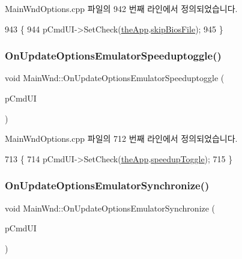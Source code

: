Main\+Wnd\+Options.\+cpp 파일의 942 번째 라인에서 정의되었습니다.


\begin{DoxyCode}
943 \{
944   pCmdUI->SetCheck(\mbox{\hyperlink{_v_b_a_8cpp_a8095a9d06b37a7efe3723f3218ad8fb3}{theApp}}.\mbox{\hyperlink{class_v_b_a_a5cb340a521f9f53bf082a63b26fbda25}{skipBiosFile}});
945 \}
\end{DoxyCode}
\mbox{\label{class_main_wnd_af19332119096c90e31ee0c2f49ec8359}} 
\subsubsection{\texorpdfstring{On\+Update\+Options\+Emulator\+Speeduptoggle()}{OnUpdateOptionsEmulatorSpeeduptoggle()}}
{\footnotesize\ttfamily void Main\+Wnd\+::\+On\+Update\+Options\+Emulator\+Speeduptoggle (\begin{DoxyParamCaption}\item[{C\+Cmd\+UI $\ast$}]{p\+Cmd\+UI }\end{DoxyParamCaption})\hspace{0.3cm}{\ttfamily [protected]}}



Main\+Wnd\+Options.\+cpp 파일의 712 번째 라인에서 정의되었습니다.


\begin{DoxyCode}
713 \{
714   pCmdUI->SetCheck(\mbox{\hyperlink{_v_b_a_8cpp_a8095a9d06b37a7efe3723f3218ad8fb3}{theApp}}.\mbox{\hyperlink{class_v_b_a_aab299545104f6df869bf8f7abee6ef0a}{speedupToggle}});
715 \}
\end{DoxyCode}
\mbox{\label{class_main_wnd_a8a7e869df1655fe77cb450db712fd9a9}} 
\subsubsection{\texorpdfstring{On\+Update\+Options\+Emulator\+Synchronize()}{OnUpdateOptionsEmulatorSynchronize()}}
{\footnotesize\ttfamily void Main\+Wnd\+::\+On\+Update\+Options\+Emulator\+Synchronize (\begin{DoxyParamCaption}\item[{C\+Cmd\+UI $\ast$}]{p\+Cmd\+UI }\end{DoxyParamCaption})\hspace{0.3cm}{\ttfamily [protected]}}



